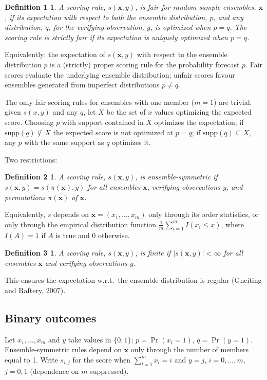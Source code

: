 \documentclass{article}
\newtheorem*{definition1}{Definition 1}
\newtheorem*{definition2}{Definition 2}
\newtheorem*{definition3}{Definition 3}
\newcommand{\bx}{\mathbf{x}}
\begin{document}
\begin{definition1}
A scoring rule, $s(\bx,y)$, is \emph{fair} for random sample ensembles, $\bx$,
if its expectation with respect to both the ensemble distribution, $p$, and any
distribution, $q$, for the verifying observation, $y$, is optimized when $p=q$.
The scoring rule is \emph{strictly fair} if its expectation is uniquely
optimized when $p=q$.
\end{definition1}

Equivalently: the expectation of $s(\bx,y)$ with respect to the ensemble
distribution $p$ is a (strictly) proper scoring rule for the probability
forecast $p$. Fair scores evaluate the underlying ensemble distribution; unfair
scores favour ensembles generated from imperfect distributions $p\neq q$.

The only fair scoring rules for ensembles with one member ($m=1$) are trivial:
given $s(x,y)$ and any $q$, let $X$ be the set of $x$ values optimizing the
expected score. Choosing $p$ with support contained in $X$ optimizes the
expectation; if $\mathrm{supp}(q)\not\subseteq X$ the expected score is not
optimized at $p=q$; if $\mathrm{supp}(q)\subseteq X$, any $p$ with the same
support as $q$ optimizes it.

Two restrictions:
\begin{definition2}
A scoring rule, $s(\bx,y)$, is \emph{ensemble-symmetric} if
$s(\bx,y)=s(\pi(\bx),y)$ for all ensembles $\bx$, verifying observations $y$,
and permutations $\pi(\bx)$ of $\bx$.
\end{definition2}
Equivalently, $s$ depends on $\bx=(x_1,\dots,x_m)$ only through its order
statistics, or only through the empirical distribution function
$\frac1m\sum_{i=1}^m I(x_i\le x)$, where $I(A)=1$ if $A$ is true and $0$
otherwise.

\begin{definition3}
A scoring rule, $s(\bx,y)$, is \emph{finite} if $|s(\bx,y)|<\infty$ for all
ensembles $\bx$ and verifying observations $y$.
\end{definition3}
This ensures the expectation w.r.t.\ the ensemble distribution is regular
(Gneiting and Raftery, 2007).

\subsection{Binary outcomes}
Let $x_1,\dots,x_m$ and $y$ take values in $\{0,1\}$; $p=\Pr(x_i=1)$,
$q=\Pr(y=1)$. Ensemble-symmetric rules depend on $\bx$ only through the number
of members equal to 1. Write $s_{i,j}$ for the score when $\sum_{l=1}^m x_l=i$
and $y=j$, $i=0,\dots,m$, $j=0,1$ (dependence on $m$ suppressed).
\end{document}
